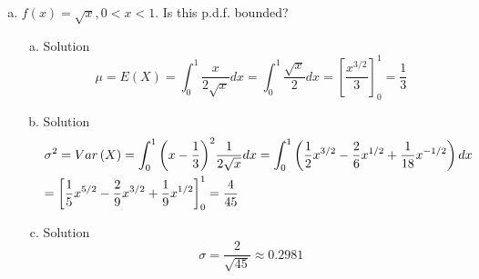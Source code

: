 \documentclass{article}
\begin{document}
\begin{spacing}{1.1}
\begin{homeworkProblem}
\begin{enumerate}[(a)]
\begin{enumerate}[(a)]
\begin{homeworkSection}{Solution}
						\[\mu  = E\left( X \right) = \int_{ - 2}^2 {\left( {\frac{3}{{16}}} \right){x^2}dx}  = \left[ {\frac{3}{{64}}{x^4}} \right]_{ - 2}^2 = \frac{{48}}{{64}} - \frac{{48}}{{64}} = 0\]
					\end{homeworkSection}
				\item
					\begin{homeworkSection}{Solution}
						\[{\sigma ^2} = Var\left( X \right) = \int_{ - 2}^2 {\left( {\frac{3}{{16}}} \right){x^4}dx}  = \left[ {\frac{3}{{80}}{x^5}} \right]_{ - 2}^2 = \frac{{96}}{{80}} + \frac{{96}}{{80}} = \frac{{12}}{5}\]
					\end{homeworkSection}
				\item
					\begin{homeworkSection}{Solution}
						\[\sigma  = \sqrt {\frac{{12}}{5}}  \approx 1.5492\]
					\end{homeworkSection}
			\end{enumerate}
		\item $f(x) = \sqrt x, 0 < x < 1$.  Is this p.d.f. bounded?
			\begin{enumerate}[(a)]
				\item
					\begin{homeworkSection}{Solution}
						\[\mu  = E\left( X \right) = \int_0^1 {\frac{x}{{2\sqrt x }}dx}  = \int_0^1 {\frac{{\sqrt x }}{2}dx}  = \left[ {\frac{{{x^{3/2}}}}{3}} \right]_0^1 = \frac{1}{3}\]
					\end{homeworkSection}
				\item
					\begin{homeworkSection}{Solution}
						\[\begin{gathered}
						  {\sigma ^2} = Var\left( X \right) = \int_0^1 {{{\left( {x - \frac{1}{3}} \right)}^2}\frac{1}{{2\sqrt x }}dx}  = \int_0^1 {\left( {\frac{1}{2}{x^{3/2}} - \frac{2}{6}{x^{1/2}} + \frac{1}{{18}}{x^{ - 1/2}}} \right)dx}  \hfill \\
						   = \left[ {\frac{1}{5}{x^{5/2}} - \frac{2}{9}{x^{3/2}} + \frac{1}{9}{x^{1/2}}} \right]_0^1 = \frac{4}{{45}} \hfill \\ 
						\end{gathered} \]						
					\end{homeworkSection}
				\item
					\begin{homeworkSection}{Solution}
						\[\sigma  = \frac{2}{{\sqrt {45} }} \approx 0.2981\]
					\end{homeworkSection}
			\end{enumerate}
	\end{enumerate}
\end{homeworkProblem}



\end{spacing}
\end{document}
